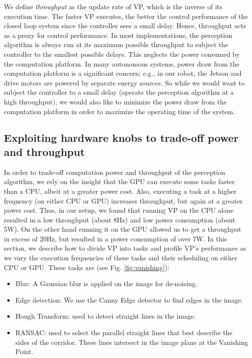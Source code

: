 We define \textit{throughput} as the update rate of VP, which is the inverse of its execution time. 
 The faster VP executes, the better the control performance of the closed loop system since the controller sees a small delay. 
 Hence, throughput acts as a proxy for control performance. 
 In most implementations, the perception algorithm is always run at its maximum possible throughput to subject the controller to the smallest possible delays.
 This neglects the power consumed by the computation platform.
 In many autonomous systems, power draw from the computation platform is a significant concern; e.g., in our robot, the Jetson and drive motors are powered by separate energy sources.
 So while we would want to subject the controller to a small delay (operate the perception algorithm at a high throughput), we would also like to minimize the power draw from the computation platform in order to maximize the operating time of the system. 
  

\subsection{Exploiting hardware knobs to trade-off power and throughput}
\label{sec:knobs}
In order to trade-off computation power and throughput of the perception algorithm, we rely on the insight that the GPU can execute some tasks faster than a CPU, albeit at a greater power cost.
Also, executing a task at a higher frequency (on either CPU or GPU) increases throughput, but again at a greater power cost.
Thus, in our setup, we found that running VP on the CPU alone resulted in a low throughput (about 8Hz) and low power consumption (about 5W). 
On the other hand running it on the GPU allowed us to get a throughput in excess of 20Hz, but resulted in a power consumption of over 7W. 
In this section, we describe how to divide VP into tasks and profile VP's performance as we vary the execution frequencies of these tasks and their scheduling on either CPU or GPU.
These tasks are (see Fig. \ref{fig:vanishing}):

\begin{itemize}
\item Blur: A Gaussian blur is applied on the image for de-noising.
\item Edge detection: We use the Canny Edge detector to find edges in the image.
\item Hough Transform: used to detect straight lines in the image.
\item RANSAC: used to select the parallel straight lines that best describe the sides of the corridor. These lines intersect in the image plane at the Vanishing Point.
\end{itemize}

